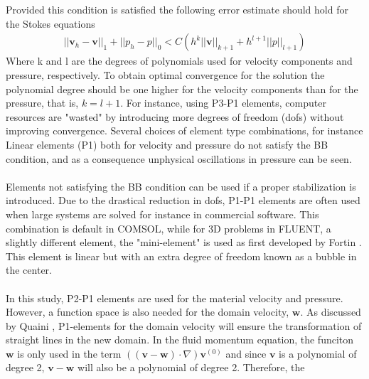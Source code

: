 \\
\\
Provided this condition is satisfied the following error estimate should hold for the Stokes equations
\begin{align}
||\mathbf{v}_h-\mathbf{v}||_1 + ||p_h - p||_0 < C(h^k||\mathbf{v}||_{k+1} + h^{l+1}||p||_{l+1})
\end{align}
Where k and l are the degrees of polynomials used for velocity components and pressure, respectively. To obtain optimal convergence for the solution the polynomial degree should be one higher for the velocity components than for the pressure, that is, $k = l+1$. For instance, using P3-P1 elements, computer resources are "wasted" by introducing more degrees of freedom (dofs) without improving convergence. Several choices of element type combinations, for instance Linear elements (P1) both for velocity and pressure do not satisfy the BB condition, and as a consequence unphysical oscillations in pressure can be seen. 
\\
\\
Elements not satisfying the BB condition can be used if a proper stabilization is introduced. Due to the drastical reduction in dofs, P1-P1 elements are often used when large systems are solved for instance in commercial software. This combination is default in COMSOL, while for 3D problems in FLUENT, a slightly different element, the "mini-element" is used as first developed by Fortin \cite{Fort81}. This element is linear but with an extra degree of freedom known as a bubble in the center. 
\\
\\
In this study, P2-P1 elements are used for the material velocity and pressure. However, a function space is also needed for the domain velocity, $\mathbf{w}$. As discussed by Quaini \cite{Quai09}, P1-elements for the domain velocity will ensure the transformation of straight lines in the new domain. In the fluid momentum equation, the funciton $\mathbf{w}$ is only used in the term $((\mathbf{v}-\mathbf{w})\cdot \nabla) \mathbf{v}^{(0)}$ and since $\mathbf{v}$ is a polynomial of degree 2, $\mathbf{v}-\mathbf{w}$ will also be a polynomial of degree 2. Therefore, the 


